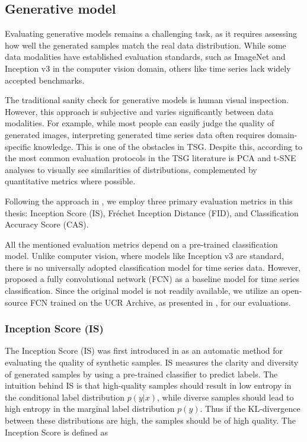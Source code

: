 \documentclass[../../thesis.tex]{subfiles}
\begin{document}
\subsection{Generative model}

Evaluating generative models remains a challenging task, as it requires assessing how well the generated samples match the real data distribution. While some data modalities have established evaluation standards, such as ImageNet and Inception v3 in the computer vision domain, others like time series lack widely accepted benchmarks.\newline

The traditional sanity check for generative models is human visual inspection. However, this approach is subjective and varies significantly between data modalities. For example, while most people can easily judge the quality of generated images, interpreting generated time series data often requires domain-specific knowledge. This is one of the obstacles in TSG. Despite this, according to \cite{TimeVQVAE} the most common evaluation protocols in the TSG literature is PCA and t-SNE analyses to visually see similarities of distributions, complemented by quantitative metrics where possible.\newline

Following the approach in \cite{TimeVQVAE}, we employ three primary evaluation metrics in this thesis: Inception Score (IS), Fréchet Inception Distance (FID), and Classification Accuracy Score (CAS).\newline

All the mentioned evaluation metrics depend on a pre-trained classification model. Unlike computer vision, where models like Inception v3 are standard, there is no universally adopted classification model for time series data. However, \cite{wang2016time} proposed a fully convolutional network (FCN) as a baseline model for time series classification. Since the original model is not readily available, we utilize an open-source FCN trained on the UCR Archive, as presented in \cite{TimeVQVAE}, for our evaluations.

\subsubsection{Inception Score (IS)}

The Inception Score (IS) was first introduced in \cite{salimans2016improved} as an automatic method for evaluating the quality of synthetic samples. IS measures the clarity and diversity of generated samples by using a pre-trained classifier to predict labels. The intuition behind IS is that high-quality samples should result in low entropy in the conditional label distribution $p(y|x)$, while diverse samples should lead to high entropy in the marginal label distribution $p(y)$. Thus if the KL-divergence between these distributions are high, the samples should be of high quality. The Inception Score is defined as 
\end{document}

